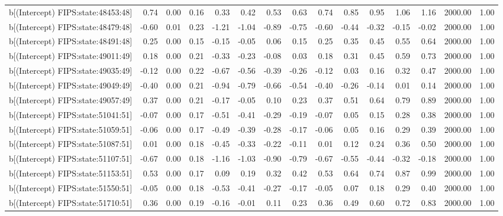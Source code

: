 \begin{table}[ht]
\begin{tabular}{rrrrrrrrrrrrrrr}
  b[(Intercept) FIPS:state:48453:48] & 0.74 & 0.00 & 0.16 & 0.33 & 0.42 & 0.53 & 0.63 & 0.74 & 0.85 & 0.95 & 1.06 & 1.16 & 2000.00 & 1.00 \\ 
  b[(Intercept) FIPS:state:48479:48] & -0.60 & 0.01 & 0.23 & -1.21 & -1.04 & -0.89 & -0.75 & -0.60 & -0.44 & -0.32 & -0.15 & -0.02 & 2000.00 & 1.00 \\ 
  b[(Intercept) FIPS:state:48491:48] & 0.25 & 0.00 & 0.15 & -0.15 & -0.05 & 0.06 & 0.15 & 0.25 & 0.35 & 0.45 & 0.55 & 0.64 & 2000.00 & 1.00 \\ 
  b[(Intercept) FIPS:state:49011:49] & 0.18 & 0.00 & 0.21 & -0.33 & -0.23 & -0.08 & 0.03 & 0.18 & 0.31 & 0.45 & 0.59 & 0.73 & 2000.00 & 1.00 \\ 
  b[(Intercept) FIPS:state:49035:49] & -0.12 & 0.00 & 0.22 & -0.67 & -0.56 & -0.39 & -0.26 & -0.12 & 0.03 & 0.16 & 0.32 & 0.47 & 2000.00 & 1.00 \\ 
  b[(Intercept) FIPS:state:49049:49] & -0.40 & 0.00 & 0.21 & -0.94 & -0.79 & -0.66 & -0.54 & -0.40 & -0.26 & -0.14 & 0.01 & 0.14 & 2000.00 & 1.00 \\ 
  b[(Intercept) FIPS:state:49057:49] & 0.37 & 0.00 & 0.21 & -0.17 & -0.05 & 0.10 & 0.23 & 0.37 & 0.51 & 0.64 & 0.79 & 0.89 & 2000.00 & 1.00 \\ 
  b[(Intercept) FIPS:state:51041:51] & -0.07 & 0.00 & 0.17 & -0.51 & -0.41 & -0.29 & -0.19 & -0.07 & 0.05 & 0.15 & 0.28 & 0.38 & 2000.00 & 1.00 \\ 
  b[(Intercept) FIPS:state:51059:51] & -0.06 & 0.00 & 0.17 & -0.49 & -0.39 & -0.28 & -0.17 & -0.06 & 0.05 & 0.16 & 0.29 & 0.39 & 2000.00 & 1.00 \\ 
  b[(Intercept) FIPS:state:51087:51] & 0.01 & 0.00 & 0.18 & -0.45 & -0.33 & -0.22 & -0.11 & 0.01 & 0.12 & 0.24 & 0.36 & 0.50 & 2000.00 & 1.00 \\ 
  b[(Intercept) FIPS:state:51107:51] & -0.67 & 0.00 & 0.18 & -1.16 & -1.03 & -0.90 & -0.79 & -0.67 & -0.55 & -0.44 & -0.32 & -0.18 & 2000.00 & 1.00 \\ 
  b[(Intercept) FIPS:state:51153:51] & 0.53 & 0.00 & 0.17 & 0.09 & 0.19 & 0.32 & 0.42 & 0.53 & 0.64 & 0.74 & 0.87 & 0.99 & 2000.00 & 1.00 \\ 
  b[(Intercept) FIPS:state:51550:51] & -0.05 & 0.00 & 0.18 & -0.53 & -0.41 & -0.27 & -0.17 & -0.05 & 0.07 & 0.18 & 0.29 & 0.40 & 2000.00 & 1.00 \\ 
  b[(Intercept) FIPS:state:51710:51] & 0.36 & 0.00 & 0.19 & -0.16 & -0.01 & 0.11 & 0.23 & 0.36 & 0.49 & 0.60 & 0.72 & 0.83 & 2000.00 & 1.00 \\ 

\end{tabular}
\end{table}
